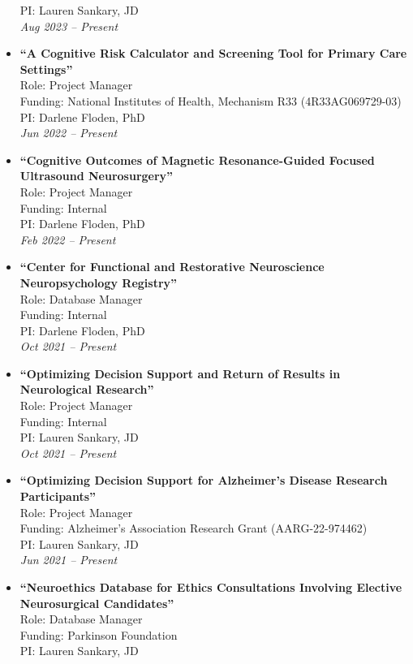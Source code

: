 \documentclass[
  letterpaper,
  DIV=11,
  numbers=noendperiod]{scrartcl}
\begin{document}
\begin{itemize}
  PI: Lauren Sankary, JD\\
  \emph{Aug 2023 -- Present}
\item
  \textbf{``A Cognitive Risk Calculator and Screening Tool for Primary
  Care Settings''}\\
  Role: Project Manager\\
  Funding: National Institutes of Health, Mechanism R33
  (4R33AG069729-03)\\
  PI: Darlene Floden, PhD\\
  \emph{Jun 2022 -- Present}
\item
  \textbf{``Cognitive Outcomes of Magnetic Resonance-Guided Focused
  Ultrasound Neurosurgery''}\\
  Role: Project Manager\\
  Funding: Internal\\
  PI: Darlene Floden, PhD\\
  \emph{Feb 2022 -- Present}
\item
  \textbf{``Center for Functional and Restorative Neuroscience
  Neuropsychology Registry''}\\
  Role: Database Manager\\
  Funding: Internal\\
  PI: Darlene Floden, PhD\\
  \emph{Oct 2021 -- Present}
\item
  \textbf{``Optimizing Decision Support and Return of Results in
  Neurological Research''}\\
  Role: Project Manager\\
  Funding: Internal\\
  PI: Lauren Sankary, JD\\
  \emph{Oct 2021 -- Present}
\item
  \textbf{``Optimizing Decision Support for Alzheimer's Disease Research
  Participants''}\\
  Role: Project Manager\\
  Funding: Alzheimer's Association Research Grant (AARG-22-974462)\\
  PI: Lauren Sankary, JD\\
  \emph{Jun 2021 -- Present}
\item
  \textbf{``Neuroethics Database for Ethics Consultations Involving
  Elective Neurosurgical Candidates''}\\
  Role: Database Manager\\
  Funding: Parkinson Foundation\\
  PI: Lauren Sankary, JD\\

\end{itemize}
\end{document}
